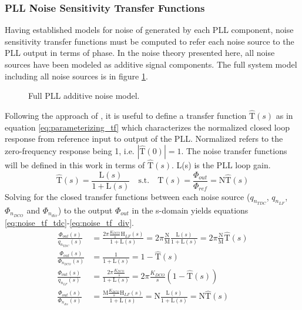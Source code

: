 \subsubsection{PLL Noise Sensitivity Transfer Functions}\label{ntfs}
	Having established models for noise of generated by each PLL component, noise sensitivity transfer functions must be computed to refer each noise source to the PLL output in terms of phase. In the noise theory presented here, all noise sources have been modeled as additive signal components. The full system model including all noise sources is in figure \ref{fig:full_pll_noise}.
	\begin{figure}[htb!]
		\center
		\caption{Full PLL additive noise model.}
		\label{fig:full_pll_noise}
	\end{figure}
	\FloatBarrier
	Following the approach of \cite{perrott_2002}, it is useful to define a transfer function $\hat{\mathrm{T}}(s)$ as in equation \ref{eq:parameterizing_tf} which characterizes the normalized closed loop response from reference input to output of the PLL. Normalized refers to the zero-frequency response being 1, i.e. $|\hat{\mathrm{T}}(0)|=1$. The noise transfer functions will be defined in this work in terms of $\hat{\mathrm{T}}(s)$. L(s) is the PLL loop gain. 
	\begin{equation}\label{eq:parameterizing_tf}
	\hat{\mathrm{T}}(s) = \frac{\mathrm{L}(s)}{1+\mathrm{L}(s)}\hspace{1em} \text{s.t.} \hspace{1em} \mathrm{T}(s) = \frac{\Phi_{out}}{\Phi_{ref}} = \mathrm{N}\hat{\mathrm{T}}(s) 
	\end{equation}
	Solving for the closed transfer functions between each noise source ($q_{n_{TDC}}$, $q_{n_{LF}}$, $\Phi_{n_{DCO}}$ and $\Phi_{n_{div}}$) to the output $\Phi_{out}$ in the s-domain yields equations \ref{eq:noise_tf_tdc}-\ref{eq:noise_tf_div}.
	\begin{align}
		\frac{\Phi_{out}(s)}{q_{n_{TDC}}(s)} & = \frac{2\pi\frac{K_{DCO}}{s}\mathrm{H}_{LF}(s)}{1+\mathrm{L}(s)}= 2\pi\frac{\mathrm{N}}{\mathrm{M}}\frac{\mathrm{L}(s)}{1+\mathrm{L}(s)} = 2\pi\frac{\mathrm{N}}{\mathrm{M}}\hat{\mathrm{T}}(s)\label{eq:noise_tf_tdc}\\
		\frac{\Phi_{out}(s)}{\Phi_{n_{DCO}}(s)} & = \frac{1}{1+\mathrm{L}(s)}= 1-\hat{\mathrm{T}}(s)\\
		\frac{\Phi_{out}(s)}{q_{n_{LF}}(s)} & = \frac{2\pi\frac{K_{DCO}}{s}}{1+\mathrm{L}(s)} = 2\pi\frac{K_{DCO}}{s}(1-\hat{\mathrm{T}}(s))\\
		\frac{\Phi_{out}(s)}{\Phi_{n_{div}}(s)} & = \frac{\mathrm{M}\frac{K_{DCO}}{s}\mathrm{H}_{LF}(s)}{1+\mathrm{L}(s)}= \mathrm{N}\frac{\mathrm{L}(s)}{1+\mathrm{L}(s)} = \mathrm{N}\hat{\mathrm{T}}(s)\label{eq:noise_tf_div}
	\end{align}


